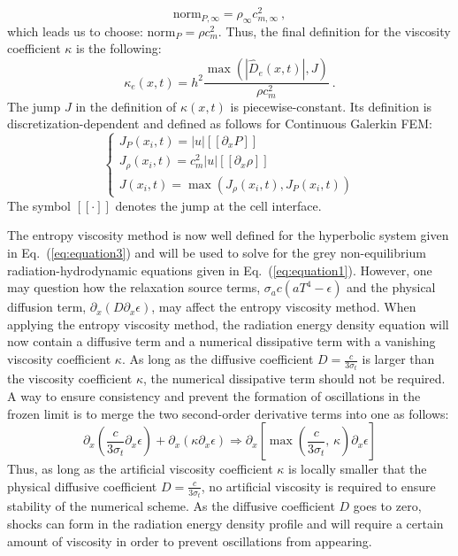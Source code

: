 \documentclass[review]{elsarticle}
\newcommand{\eqt}[1]{Eq.~(\ref{#1})}                     %
\newcommand{\norm}{\textrm{norm}}
\begin{document}
%
\begin{equation}
\norm_{P,\infty} = \rho_\infty c^2_{m,\infty} \nonumber \ ,
\end{equation}
%
which leads us to choose: $\norm_P = \rho c_m^2$. Thus, the final definition for the viscosity coefficient $\kappa$ is the following:
\begin{equation}
\label{eq:equation12bis}
\kappa_e(x,t) = h^2 \frac{\max (|\hat{D}_e(x,t)|, J)}{\rho c_m^2} \ .
\end{equation} 
The jump $J$ in the definition of $\kappa(x,t)$ is piecewise-constant. Its definition is discretization-dependent and defined as follows for Continuous Galerkin FEM: 
\begin{equation}
\label{eq:equation12ter}
\left\{
\begin{array}{lll}
J_P(x_i,t) = |u| [[\partial_x P]]\\
J_{\rho}(x_i,t) = c_m^2 |u|  [[\partial_x \rho]] \\
J(x_i,t) = \max( J_{\rho}(x_i,t), J_{P}(x_i,t) )
\end{array}
\right.
\end{equation}
The symbol $[[ \cdot ]]$ denotes the jump at the cell interface.

The entropy viscosity method is now well defined for the hyperbolic system given in \eqt{eq:equation3} and will be used to solve for the grey non-equilibrium radiation-hydrodynamic equations given in \eqt{eq:equation1}. However, one may question how the relaxation source terms, $\sigma_a c (a T^4-\epsilon)$ and the physical diffusion term, $\partial_x(D\partial_x \epsilon)$, may affect the entropy viscosity method. When applying the entropy viscosity method, the radiation energy density equation will now contain a diffusive term and a numerical dissipative term with a vanishing viscosity coefficient $\kappa$. As long as the diffusive coefficient $D=\frac{c}{3 \sigma_t}$ is larger than the viscosity coefficient $\kappa$, the numerical dissipative term should not be required. A way to ensure consistency and prevent the formation of oscillations in the frozen limit is to merge the two second-order derivative terms into one as follows:
\begin{equation}
 \partial_x \left( \frac{c}{3 \sigma_t} \partial_x \epsilon \right) + \partial_x \left( \kappa \partial_x \epsilon \right) 
 \Longrightarrow
 \partial_x \left[ \max\left(\frac{c}{3 \sigma_t} \text{, } \kappa \right) \partial_x \epsilon \right]
\end{equation}
Thus, as long as the artificial viscosity coefficient $\kappa$ is locally smaller that the physical diffusive coefficient $D=\frac{c}{3 \sigma_t}$, no artificial viscosity is required to ensure stability of the numerical scheme. As the diffusive coefficient $D$ goes to zero, shocks can form in the radiation energy density profile and will require a certain amount of viscosity in order to prevent oscillations from appearing.
\end{document}
